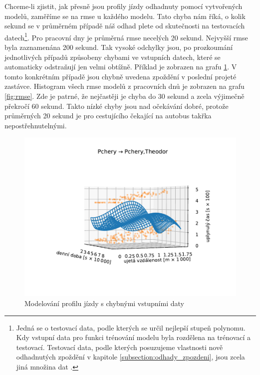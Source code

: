 \bigbreak


Chceme-li zjistit, jak přesně jsou profily jízdy odhadnuty pomocí vytvořených modelů, zaměříme se na \gls{rmse} u každého modelu. Tato chyba nám říká, o kolik sekund se v průměrném případě náš odhad plete od skutečnosti na testovacích datech\footnote{Jedná se o testovací data, podle kterých se určil nejlepší stupeň polynomu. Kdy vstupní data pro funkci trénování modelu byla rozdělena na trénovací a testovací. Testovací data, podle kterých posuzujeme vlastnosti nově odhadnutých zpoždění v kapitole \ref{subsection:odhady_zpozdeni}, jsou zcela jiná množina dat \citep[viz][Strana 365, validation set a test set]{Ripley96}.}. Pro pracovní dny je průměrná \gls{rmse} necelých 20 sekund. Nejvyšší \gls{rmse} byla zaznamenána 200 sekund. Tak vysoké odchylky jsou, po prozkoumání jednotlivých případů způsobeny chybami ve vstupních datech, které se automaticky odstraňují jen velmi obtížně. Příklad je zobrazen na grafu \ref{fig:chyba_zpozdeni_v_posledni_zastavce}. V tomto konkrétním případě jsou chybně uvedena zpoždění v poslední projeté zastávce. Histogram všech \gls{rmse} modelů z pracovních dnů je zobrazen na grafu \ref{fig:rmse}. Zde je patrné, že nejčastěji je chyba do 30 sekund a zcela výjimečně překročí 60 sekund. Takto nízké chyby jsou nad očekávání dobré, protože průměrných 20 sekund je pro cestujícího čekající na autobus takřka nepostřehnutelnými.


\begin{figure}
   \centering
 \includegraphics[width=\linewidth]{../img/134_135}
 \caption{Modelování profilu jízdy s chybnými vstupními daty}
 \label{fig:chyba_zpozdeni_v_posledni_zastavce}
\end{figure}


